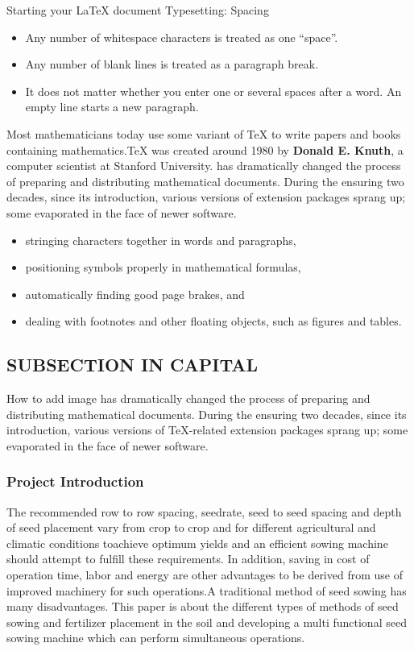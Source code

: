 \documentclass[12pt,a4paper]{article}
\numberwithin{figure}{section}
\numberwithin{table}{section}
\begin{document}
{Starting your LaTeX document}
{Typesetting: Spacing}
\begin{itemize}
\item Any number of whitespace characters is treated as one ``space''.
\item Any number of blank lines is treated as a paragraph break.

\item It does not matter whether you
enter one or several     spaces
after a word.
An empty line starts a new
paragraph.
\end{itemize}
Most mathematicians today use some variant of TeX to write papers and books containing mathematics.TeX  was created around 1980 by {\bf Donald E. Knuth}, a computer scientist at Stanford University.  has dramatically changed the process of preparing and distributing mathematical documents. During the ensuring two decades, since its introduction, various versions of extension packages sprang up; some evaporated in the face of newer software.
\begin{itemize}
   \item stringing characters together in words and paragraphs,
   \item positioning symbols properly in mathematical formulas,
   \item automatically finding good page brakes, and
   \item dealing with footnotes and other floating objects, such as figures and tables.
\end{itemize}

\subsection{SUBSECTION IN  CAPITAL}
How to add image has dramatically changed the process of preparing and distributing mathematical documents. During the ensuring two decades, since its introduction, various versions of TeX-related extension packages sprang up; some evaporated in the face of newer software.
\subsubsection{Project Introduction}
		
	
The recommended row to row spacing, seedrate, seed to seed spacing and depth of seed
placement vary from crop to crop and for different agricultural and climatic conditions
toachieve optimum yields and an efficient sowing machine should attempt to fulfill these
requirements. In addition, saving in cost of operation time, labor and energy are other advantages
to be derived from use of improved machinery for such operations.A traditional method of seed
sowing has many disadvantages. This paper is about the different types of methods of seed
sowing and fertilizer placement in the soil and developing a multi functional seed sowing
machine which can perform simultaneous operations.\\
\end{document}
